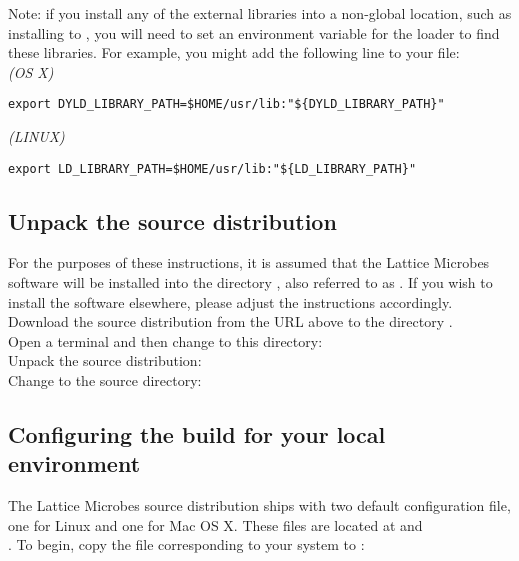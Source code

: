 Note: if you install any of the external libraries into a non-global location, such as installing to , you will need to set an environment variable for the loader to find these libraries.
For example, you might add the following line to your  file:\\

{\it (OS X)}
{\small\begin{verbatim}
export DYLD_LIBRARY_PATH=$HOME/usr/lib:"${DYLD_LIBRARY_PATH}"
\end{verbatim}}

{\it (LINUX)} 
{\small\begin{verbatim}
export LD_LIBRARY_PATH=$HOME/usr/lib:"${LD_LIBRARY_PATH}"
\end{verbatim}}

\subsection{Unpack the source distribution}

For the purposes of these instructions, it is assumed that the Lattice Microbes software will be installed into the directory , also referred to as . If you wish to install the software elsewhere, please adjust the instructions accordingly.\\

Download the source distribution from the URL above to the directory .\\

Open a terminal and then change to this directory: \\

Unpack the source distribution: \\

Change to the source directory: 

\subsection{Configuring the build for your local environment}

The Lattice Microbes source distribution ships with two default configuration file, one for Linux and one for Mac OS X. These files are located at  and\\. To begin, copy the file corresponding to your system to :\\
\\

